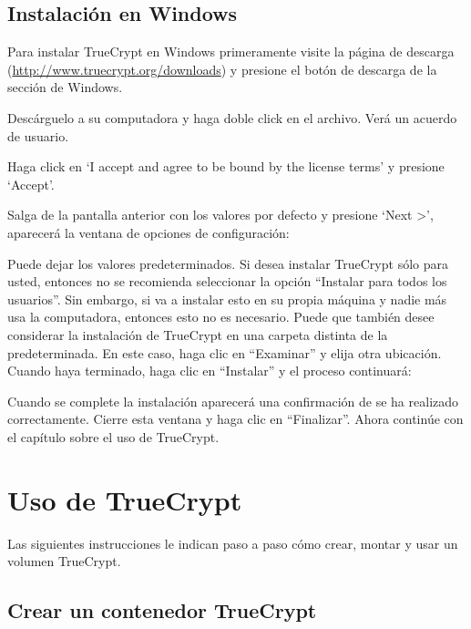 \documentclass[10pt,a5paper,twoside,,]{book}
\begin{document}
\section{Instalación en Windows}\label{instalaciuxf3n-en-windows}

Para instalar TrueCrypt en Windows primeramente visite la página de
descarga (\url{http://www.truecrypt.org/downloads}) y presione el botón
de descarga de la sección de Windows.

Descárguelo a su computadora y haga doble click en el archivo. Verá un
acuerdo de usuario.

Haga click en `I accept and agree to be bound by the license terms' y
presione `Accept'.

Salga de la pantalla anterior con los valores por defecto y presione
`Next \textgreater{}', aparecerá la ventana de opciones de
configuración:

Puede dejar los valores predeterminados. Si desea instalar TrueCrypt
sólo para usted, entonces no se recomienda seleccionar la opción
``Instalar para todos los usuarios''. Sin embargo, si va a instalar esto
en su propia máquina y nadie más usa la computadora, entonces esto no es
necesario. Puede que también desee considerar la instalación de
TrueCrypt en una carpeta distinta de la predeterminada. En este caso,
haga clic en ``Examinar'' y elija otra ubicación. Cuando haya terminado,
haga clic en ``Instalar'' y el proceso continuará:

Cuando se complete la instalación aparecerá una confirmación de se ha
realizado correctamente. Cierre esta ventana y haga clic en
``Finalizar''. Ahora continúe con el capítulo sobre el uso de TrueCrypt.

\chapter{Uso de TrueCrypt}\label{uso-de-truecrypt}

Las siguientes instrucciones le indican paso a paso cómo crear, montar y
usar un volumen TrueCrypt.

\section{Crear un contenedor
TrueCrypt}\label{crear-un-contenedor-truecrypt}
\end{document}
